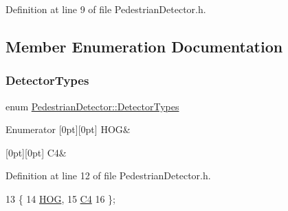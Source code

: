 Definition at line 9 of file Pedestrian\+Detector.\+h.



\subsection{Member Enumeration Documentation}
\mbox{\label{class_pedestrian_detector_aa2136624089c144b4ef5f3598de00d8c}} 
\subsubsection{\texorpdfstring{Detector\+Types}{DetectorTypes}}
{\footnotesize\ttfamily enum \mbox{\hyperlink{class_pedestrian_detector_aa2136624089c144b4ef5f3598de00d8c}{Pedestrian\+Detector\+::\+Detector\+Types}}}

\begin{DoxyEnumFields}{Enumerator}
[0pt][0pt]{}\mbox{\label{class_pedestrian_detector_aa2136624089c144b4ef5f3598de00d8ca47cb01f997c4439468112272761fc7de}} 
H\+OG&\\
\hline

[0pt][0pt]{}\mbox{\label{class_pedestrian_detector_aa2136624089c144b4ef5f3598de00d8ca408a85378caa7239ba0ded11495782fd}} 
C4&\\
\hline

\end{DoxyEnumFields}


Definition at line 12 of file Pedestrian\+Detector.\+h.


\begin{DoxyCode}
13     \{
14         \mbox{\hyperlink{class_pedestrian_detector_aa2136624089c144b4ef5f3598de00d8ca47cb01f997c4439468112272761fc7de}{HOG}},
15         \mbox{\hyperlink{class_pedestrian_detector_aa2136624089c144b4ef5f3598de00d8ca408a85378caa7239ba0ded11495782fd}{C4}}
16     \};
\end{DoxyCode}


